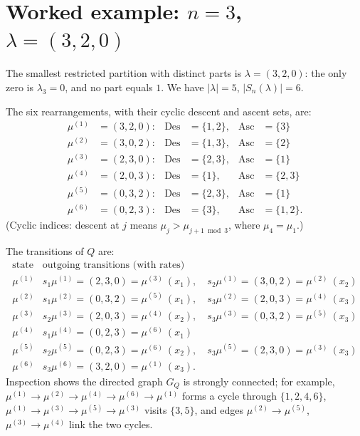 \documentclass[12pt]{article}
\theoremstyle{definition}
\begin{document}
\section{Worked example: $n=3$, $\lambda=(3,2,0)$}

The smallest restricted partition with distinct parts is $\lambda=(3,2,0)$:
the only zero is $\lambda_3=0$, and no part equals $1$. We have
$|\lambda|=5$, $|S_n(\lambda)|=6$.

The six rearrangements, with their cyclic descent and ascent sets, are:
\begin{align*}
\mu^{(1)}&=(3,2,0): &\mathrm{Des}&=\{1,2\}, &\mathrm{Asc}&=\{3\}\\
\mu^{(2)}&=(3,0,2): &\mathrm{Des}&=\{1,3\}, &\mathrm{Asc}&=\{2\}\\
\mu^{(3)}&=(2,3,0): &\mathrm{Des}&=\{2,3\}, &\mathrm{Asc}&=\{1\}\\
\mu^{(4)}&=(2,0,3): &\mathrm{Des}&=\{1\},   &\mathrm{Asc}&=\{2,3\}\\
\mu^{(5)}&=(0,3,2): &\mathrm{Des}&=\{2,3\}, &\mathrm{Asc}&=\{1\}\\
\mu^{(6)}&=(0,2,3): &\mathrm{Des}&=\{3\},   &\mathrm{Asc}&=\{1,2\}.
\end{align*}
(Cyclic indices: descent at $j$ means $\mu_j>\mu_{j+1\bmod 3}$, where
$\mu_4=\mu_1$.)

The transitions of $Q$ are:
\[
\begin{array}{c|l}
\text{state} & \text{outgoing transitions (with rates)}\\\hline
\mu^{(1)} & s_1\mu^{(1)}=(2,3,0)=\mu^{(3)}\ (x_1),\quad
            s_2\mu^{(1)}=(3,0,2)=\mu^{(2)}\ (x_2)\\
\mu^{(2)} & s_1\mu^{(2)}=(0,3,2)=\mu^{(5)}\ (x_1),\quad
            s_3\mu^{(2)}=(2,0,3)=\mu^{(4)}\ (x_3)\\
\mu^{(3)} & s_2\mu^{(3)}=(2,0,3)=\mu^{(4)}\ (x_2),\quad
            s_3\mu^{(3)}=(0,3,2)=\mu^{(5)}\ (x_3)\\
\mu^{(4)} & s_1\mu^{(4)}=(0,2,3)=\mu^{(6)}\ (x_1)\\
\mu^{(5)} & s_2\mu^{(5)}=(0,2,3)=\mu^{(6)}\ (x_2),\quad
            s_3\mu^{(5)}=(2,3,0)=\mu^{(3)}\ (x_3)\\
\mu^{(6)} & s_3\mu^{(6)}=(3,2,0)=\mu^{(1)}\ (x_3).
\end{array}
\]
Inspection shows the directed graph $G_Q$ is strongly connected; for
example, $\mu^{(1)}\to\mu^{(2)}\to\mu^{(4)}\to\mu^{(6)}\to\mu^{(1)}$
forms a cycle through $\{1,2,4,6\}$, $\mu^{(1)}\to\mu^{(3)}\to\mu^{(5)}
\to\mu^{(3)}$ visits $\{3,5\}$, and edges $\mu^{(2)}\to\mu^{(5)}$,
$\mu^{(3)}\to\mu^{(4)}$ link the two cycles.
\end{document}
